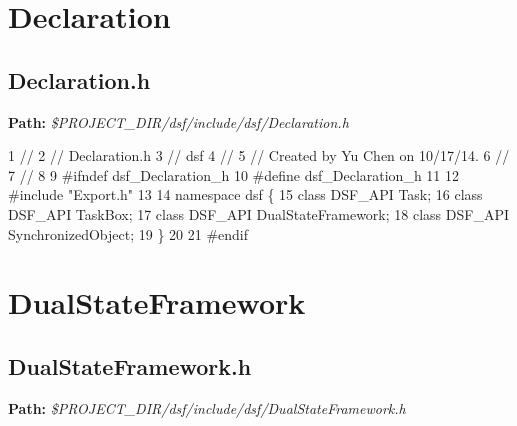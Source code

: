  \hypertarget{_dual_state_framework_DualStateFrameworkDeclaration}{}\section{Declaration}\label{_dual_state_framework_DualStateFrameworkDeclaration}
\hypertarget{_dual_state_framework_DualStateFrameworkDeclaration_h}{}\subsection{Declaration.\+h}\label{_dual_state_framework_DualStateFrameworkDeclaration_h}
{\bfseries Path\+:} {\itshape \$\+P\+R\+O\+J\+E\+C\+T\+\_\+\+D\+I\+R/dsf/include/dsf/\+Declaration.h} 
\begin{DoxyCodeInclude}
1 \textcolor{comment}{//}
2 \textcolor{comment}{//  Declaration.h}
3 \textcolor{comment}{//  dsf}
4 \textcolor{comment}{//}
5 \textcolor{comment}{//  Created by Yu Chen on 10/17/14.}
6 \textcolor{comment}{//}
7 \textcolor{comment}{//}
8 
9 \textcolor{preprocessor}{#ifndef dsf\_Declaration\_h}
10 \textcolor{preprocessor}{#define dsf\_Declaration\_h}
11 
12 \textcolor{preprocessor}{#include "Export.h"}
13 
14 \textcolor{keyword}{namespace }dsf \{
15     \textcolor{keyword}{class }DSF\_API Task;
16     \textcolor{keyword}{class }DSF\_API TaskBox;
17     \textcolor{keyword}{class }DSF\_API DualStateFramework;
18     \textcolor{keyword}{class }DSF\_API SynchronizedObject;
19 \}
20 
21 \textcolor{preprocessor}{#endif}
\end{DoxyCodeInclude}
 \hypertarget{_dual_state_framework_DualStateFrameworkDualStateFramework}{}\section{Dual\+State\+Framework}\label{_dual_state_framework_DualStateFrameworkDualStateFramework}
\hypertarget{_dual_state_framework_DualStateFrameworkDualStateFramework_h}{}\subsection{Dual\+State\+Framework.\+h}\label{_dual_state_framework_DualStateFrameworkDualStateFramework_h}
{\bfseries Path\+:} {\itshape \$\+P\+R\+O\+J\+E\+C\+T\+\_\+\+D\+I\+R/dsf/include/dsf/\+Dual\+State\+Framework.h} 
